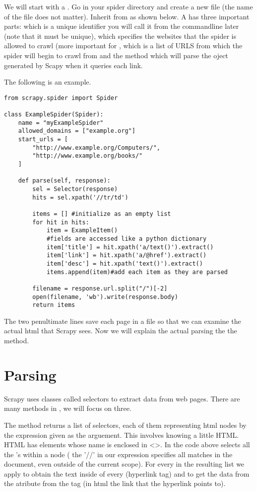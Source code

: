 We will start with a . 
Go in your spider directory and create a new file (the name of the file does not matter). 
Inherit from  as shown below. 
A  has three important parts:  which is a unique identifier you will call it from the commandline later (note that it must be unique),  which specifies the websites that the spider is allowed to crawl (more important for ,  which is a list of URLS from which the spider will begin to crawl from and the method  which will parse the  oject generated by Scapy when it queries each link. 

The following is an example.
\begin{lstlisting}
from scrapy.spider import Spider

class ExampleSpider(Spider):
    name = "myExampleSpider"
    allowed_domains = ["example.org"]
    start_urls = [
        "http://www.example.org/Computers/",
        "http://www.example.org/books/"
    ]

    def parse(self, response):
        sel = Selector(response)
        hits = sel.xpath('//tr/td')

        items = [] #initialize as an empty list
        for hit in hits:
            item = ExampleItem()
			#fields are accessed like a python dictionary
            item['title'] = hit.xpath('a/text()').extract()
            item['link'] = hit.xpath('a/@href').extract()
            item['desc'] = hit.xpath('text()').extract()
            items.append(item)#add each item as they are parsed

		filename = response.url.split("/")[-2]
        open(filename, 'wb').write(response.body)
        return items

\end{lstlisting}

The two penultimate lines save each page in a file so that we can examine the actual html that Scrapy sees.
Now we will explain the actual parsing the the  method.

\section*{Parsing}
Scrapy uses classes called selectors to extract data from web pages.
There are many methods in , we will focus on three.

The  method returns a list of selectors, each of them representing html nodes by the expression given as the arguement. 
This involves knowing a little HTML. 
HTML has elements whose name is enclosed in <>. 
In the code above  selects  all the 's within a  node ( the '//' in our expression specifies all matches in the document, even outside of the current scope). 
For every  in the resulting list we apply  to obtain the text inside of every  (hyperlink tag) and  to get the data from the  atribute from the  tag (in html the link that the hyperlink points to). 


